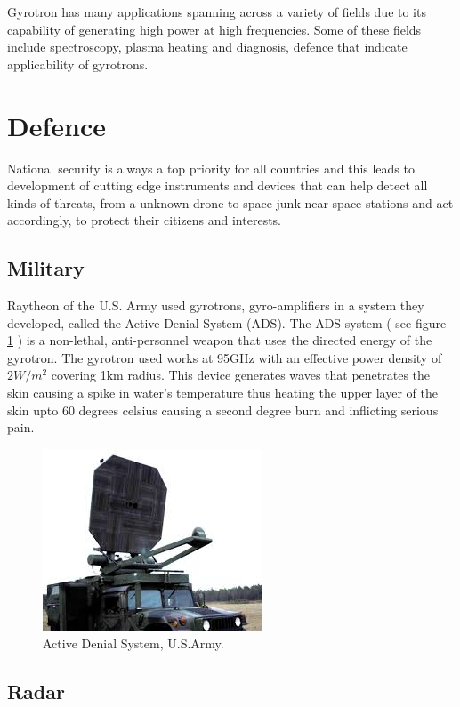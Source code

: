 Gyrotron has many applications spanning across a variety of fields due to its capability of generating high power at high frequencies.
Some of these fields include spectroscopy, plasma heating and diagnosis, defence that indicate applicability of gyrotrons.

\section{Defence}

National security is always a top priority for all countries and this leads to development of cutting edge instruments and devices that can help detect all kinds of threats, from a unknown drone to space junk near space stations and act accordingly, to protect their citizens and interests.

\subsection{Military}

Raytheon of the U.S. Army used gyrotrons, gyro-amplifiers in a system they developed, called the Active Denial System (ADS). The ADS system ( see figure \ref{fig:ads} ) is a non-lethal, anti-personnel weapon that uses the directed energy of the gyrotron. The gyrotron used works at 95GHz with an effective power density of $ 2W/m^2 $ covering 1km radius. This device generates waves that penetrates the skin causing a spike in water's temperature thus heating the upper layer of the skin upto 60 degrees celsius causing a second degree burn and inflicting serious pain.

\begin{figure}[H]
\centering
\includegraphics{images/ads}
\caption{Active Denial System, U.S.Army.}
\label{fig:ads}
\end{figure}

\subsection{Radar}

